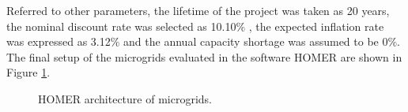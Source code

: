 \documentclass{ECOS_2019}
\begin{document}
Referred to other parameters, the lifetime of the project was taken as 20 years, the nominal discount rate was selected as 10.10\% \cite{BIDBancoInteramericanodeDesarrollo2013}, the expected inflation rate was expressed as 3.12\% \cite{BancoCentraldeBolivia2021} and the annual capacity shortage was assumed to be 0\%. The final setup of the microgrids evaluated in the software HOMER are shown in Figure \ref{fig_homer}.
\begin{figure}[h!]
    \centering
    \hfill
    \hfill
    \caption{HOMER architecture of microgrids.}
    \label{fig_homer}
\end{figure}
\end{document}
